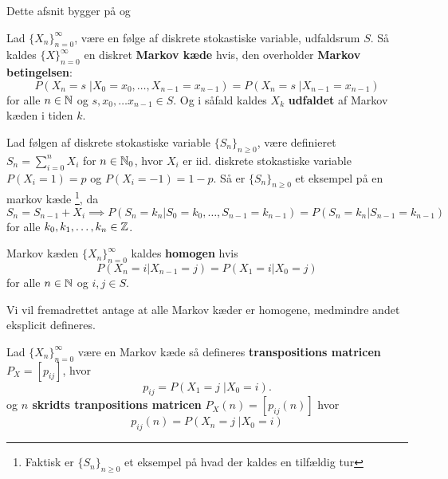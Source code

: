 Dette afsnit bygger på \cite{sandsynlighedsBog} og \cite{grimsandsynlighedsBog}
\begin{defn}
Lad $\{X_n\}_{n = 0}^\infty$, være en følge af diskrete stokastiske variable, udfaldsrum $S$. Så kaldes $\{X\}_{n = 0}^\infty$ en diskret \textbf{Markov kæde} hvis, den overholder \textbf{Markov betingelsen}:
\begin{equation*}
    P(X_n = s \;| X_0 = x_0, \ldots, X_{n - 1} = x_{n - 1}) = P(X_n = s \;| X_{n - 1} = x_{n - 1})
\end{equation*}
for alle $n \in \mathbb{N}$ og $s, x_0, \ldots x_{n - 1} \in S$. Og i såfald kaldes $X_k$ \textbf{udfaldet} af Markov kæden i tiden $k$.
\end{defn}
\begin{exmp} Lad følgen af diskrete stokastiske variable $\{S_{n}\}_{n \geq 0}$, være definieret $S_{n} = \sum_{i=0}^n X_{i}$ for $n \in \mathbb{N}_{0}$, hvor $X_{i}$ er iid. diskrete stokastiske variable $P(X_{i} = 1) = p$ og $P(X_{i} = -1) = 1 - p$. Så er $\{S_{n}\}_{n \geq 0}$ et eksempel på en markov kæde \footnote{Faktisk er $\{S_{n}\}_{n \geq 0}$ et eksempel på hvad der kaldes en tilfældig tur}, da
  \begin{equation*}
    S_{n} = S_{n - 1} + X_{i} \implies P(S_{n} = k_{n} | S_{0} = k_{0}, \ldots, S_{n - 1} = k_{n - 1}) = P(S_{n} = k_{n} | S_{n - 1} = k_{n - 1})
  \end{equation*}
  for alle $k_{0}, k_{1}, \ldots, k_{n} \in \mathbb{Z}$.
\end{exmp}
\begin{defn}
Markov kæden $\{X_n\}_{n = 0}^{\infty}$ kaldes \textbf{homogen} hvis
\begin{equation*}
    P(X_n = i | X_{n - 1} = j) = P(X_1 = i | X_0 = j)
\end{equation*}
for alle $n \in \mathbb{N}$ og $i, j \in S$.
\end{defn}
Vi vil fremadrettet antage at alle Markov kæder er homogene, medmindre andet eksplicit defineres.
\begin{defn}
Lad $\{X_n\}_{n = 0}^\infty$ være en Markov kæde så defineres \textbf{transpositions matricen} $P_X = [p_{ij}]$, hvor 
\begin{equation*}
    p_{ij} = P(X_1 = j \;| X_0 = i).
\end{equation*}
og \textbf{$n$ skridts tranpositions matricen} $P_X(n) = [p_{ij}(n)]$ hvor
\begin{equation*}
    p_{ij}(n) = P(X_n = j \;| X_0 = i)
\end{equation*}
\end{defn}

